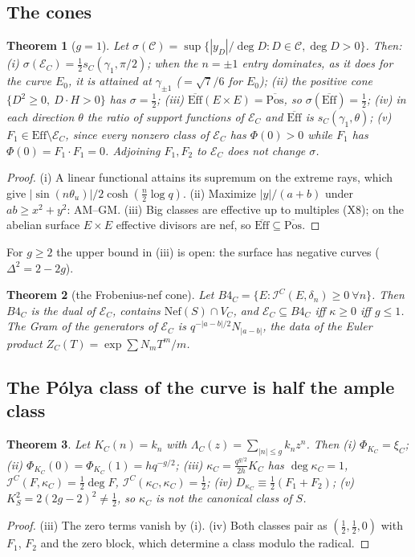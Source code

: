 \documentclass[11pt]{amsart}
\newtheorem{theorem}{Theorem}[section]
\theoremstyle{definition}
\theoremstyle{remark}
\newcommand{\Ef}{\mathcal E}
\newcommand{\I}{\mathcal I}
\newcommand{\dg}{\deg}
\newcommand{\Kc}{\kappa_C}
\begin{document}
\subsection{The cones}
\begin{theorem}[$g=1$]\label{thm:cones}
Let $\sigma(\mathcal C)=\sup\{|y_D|/\dg D:D\in\mathcal C,\dg D>0\}$. Then:
(i) $\sigma(\Ef_C)=\frac12s_C(\gamma_1,\pi/2)$; when the $n=\pm1$ entry dominates, as it does for the curve $E_0$, it is attained at $\gamma_{\pm1}$ ($=\sqrt7/6$ for $E_0$);
(ii) the positive cone $\{D^2\ge0,\ D\cdot H>0\}$ has $\sigma=\frac12$;
(iii) $\overline{\mathrm{Eff}}(E\times E)=\overline{\mathrm{Pos}}$, so $\sigma(\overline{\mathrm{Eff}})=\frac12$;
(iv) in each direction $\theta$ the ratio of support functions of $\Ef_C$ and $\overline{\mathrm{Eff}}$ is $s_C(\gamma_1,\theta)$;
(v) $F_1\in\mathrm{Eff}\setminus\Ef_C$, since every nonzero class of $\Ef_C$ has $\Phi(0)>0$ while $F_1$ has $\Phi(0)=F_1\cdot F_1=0$.
Adjoining $F_1,F_2$ to $\Ef_C$ does not change $\sigma$.
\end{theorem}
\begin{proof}
(i) A linear functional attains its supremum on the extreme rays, which give $|\sin(n\theta_u)|/2\cosh(\frac n2\log q)$.
(ii) Maximize $|y|/(a+b)$ under $ab\ge x^2+y^2$: AM--GM. (iii) Big classes are effective up to multiples (X8);
on the abelian surface $E\times E$ effective divisors are nef, so $\overline{\mathrm{Eff}}\subseteq\overline{\mathrm{Pos}}$.
\end{proof}
For $g\ge2$ the upper bound in (iii) is open: the surface has negative curves ($\Delta^2=2-2g$).

\begin{theorem}[the Frobenius-nef cone]\label{thm:B4C}
Let $B4_C=\{E:\I^C(E,\delta_n)\ge0\ \forall n\}$. Then $B4_C$ is the dual of $\Ef_C$, contains
$\mathrm{Nef}(S)\cap V_C$, and $\Ef_C\subseteq B4_C$ iff $\kappa\ge0$ iff $g\le1$. The Gram of the generators of $\Ef_C$ is
$q^{-|a-b|/2}N_{|a-b|}$, the data of the Euler product $Z_C(T)=\exp\sum N_mT^m/m$.
\end{theorem}

\subsection{The P\'olya class of the curve is half the ample class}
\begin{theorem}\label{thm:curveK}
Let $K_C(n)=k_n$ with $\Lambda_C(z)=\sum_{|n|\le g}k_nz^n$. Then (i) $\Phi_{K_C}=\xi_C$; (ii)
$\Phi_{K_C}(0)=\Phi_{K_C}(1)=hq^{-g/2}$; (iii) $\Kc=\frac{q^{g/2}}{2h}K_C$ has $\dg\Kc=1$, $\I^C(F,\Kc)=\frac12\dg F$,
$\I^C(\Kc,\Kc)=\frac12$; (iv) $D_{\Kc}\equiv\frac12(F_1+F_2)$; (v) $K_S^2=2(2g-2)^2\ne\frac12$, so $\Kc$ is not the
canonical class of $S$.
\end{theorem}
\begin{proof}
(iii) The zero terms vanish by (i). (iv) Both classes pair as $(\frac12,\frac12,0)$ with $F_1$, $F_2$ and the zero
block, which determine a class modulo the radical.
\end{proof}
\end{document}
